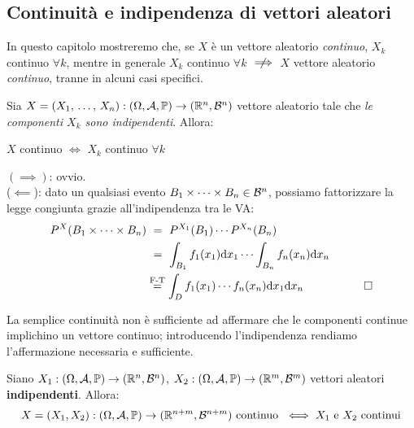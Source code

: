\subsection{Continuità e indipendenza di vettori aleatori}
In questo capitolo mostreremo che, se $X$ è un vettore aleatorio \emph{continuo}, $X_k$ continuo $\forall k$, mentre in generale $X_k$ continuo $\forall k$ $\centernot\implies$ $X$ vettore aleatorio \emph{continuo}, tranne in alcuni casi specifici.

\medskip
\begin{teo}
  Sia $X = (X_1, \, \dots, \, X_n):\DoCo[n]$ vettore aleatorio tale che \textit{le componenti $X_k$ sono indipendenti}. Allora:
  \begin{center}
    $X$ continuo $\iff$ $X_k$ continuo $\forall k$
  \end{center}
\end{teo}
\begin{dimo}
	$(\implies)$: ovvio. \\
	($\impliedby$): dato un qualsiasi evento $B_1 \times \dots \times B_n \in \mathcal B^n$, possiamo fattorizzare la legge congiunta grazie all'indipendenza tra le VA:
	\begin{align*}
		P^X(B_1 \times \dots \times B_n) & \ = \ P^{X_1}(B_1) \cdots P^{X_n}(B_n)\\
		& \ = \ \int_{B_1} f_1(x_1) \mathrm d x_1 \cdots \int_{B_n} f_n(x_n) \mathrm d x_n \\
		& \stackrel{\text{F-T}}{=} \int_D f_1(x_1)\cdots f_n(x_n)\mathrm d x_1 \mathrm d x_n & \qedhere
	\end{align*}
\end{dimo}

\smallskip
\begin{nb}
  La semplice continuità non è sufficiente ad affermare che le componenti continue implichino un vettore continuo; introducendo l'indipendenza rendiamo l'affermazione necessaria e sufficiente.
\end{nb}

\smallskip
\begin{teo}
  Siano $X_1:\DoCo[n]$, $X_2:\DoCo[m]$ vettori aleatori \textbf{indipendenti}. Allora:
  $$X = (X_1, X_2): \DoCo[n+m] \text{ continuo } \iff X_1 \text{ e } X_2 \text{ continui}$$
\end{teo}

